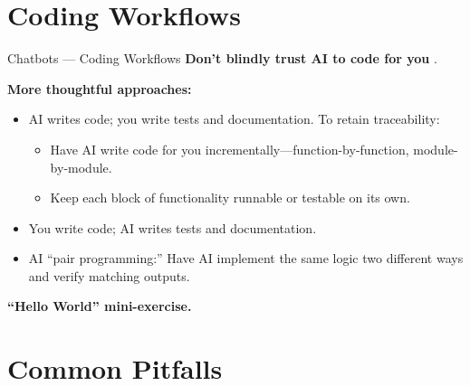 \documentclass[aspectratio=169]{beamer}
\begin{document}
\section{Coding Workflows}

\begin{frame}[t]{Chatbots — Coding Workflows}
\textbf{Don’t blindly trust AI to code for you} \parencite{graydon2025examining}.
\vspace{1em}

\textbf{More thoughtful approaches:}
\begin{itemize}
    \item AI writes code; you write tests and documentation. To retain traceability: 
    \begin{itemize}
        \item Have AI write code for you incrementally---function-by-function, module-by-module.
        \item Keep each block of functionality runnable or testable on its own.
    \end{itemize}
    \item You write code; AI writes tests and documentation.
    \item AI ``pair programming:'' Have AI implement the same logic two different ways and verify matching outputs.\\
\end{itemize} 
\vspace{1em}
\textbf{``Hello World'' mini-exercise.} 
\end{frame}

\section{Common Pitfalls}
\end{document}
